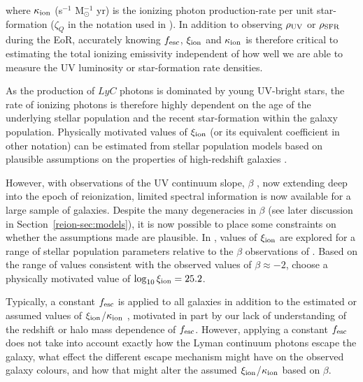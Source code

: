 \noindent where $\kappa_{\rm{ion}}$ (s$^{-1}$ M$_{\odot}^{-1}$ yr) is the ionizing photon production-rate per unit star-formation ($\zeta_{Q}$ in the notation used in \citet{2010Natur.468...49R}). In addition to observing $\rho_{\rm{UV}}$ or $\rho_{\rm{SFR}}$ during the EoR, accurately knowing $f_{\rm{esc}}$, $\xi_{\rm{ion}}$ and $\kappa_{\rm{ion}}$ is therefore critical to estimating the total ionizing emissivity independent of how well we are able to measure the UV luminosity or star-formation rate densities.

As the production of $LyC$ photons is dominated by young UV-bright stars, the rate of ionizing photons is therefore highly dependent on the age of the underlying stellar population and the recent star-formation within the galaxy population. Physically motivated values of $\xi_{\rm{ion}}$ (or its equivalent coefficient in other notation) can be estimated from stellar population models based on plausible assumptions on the properties of high-redshift galaxies \citep{Bolton:2007gc,Ouchi:2009jd,Kuhlen:2012ka}. 

However, with observations of the UV continuum slope, $\beta$ \citep{1994ApJ...429..582C}, now extending deep into the epoch of reionization, limited spectral information is now available for a large sample of galaxies. Despite the many degeneracies in $\beta$ (see later discussion in Section~\ref{reion-sec:models}), it is now possible to place some constraints on whether the assumptions made are plausible. In , values of $\xi_{\rm{ion}}$ are explored for a range of stellar population parameters relative to the $\beta$ observations of \citet{Dunlop:2013kp}. Based on the range of values consistent with the observed values of $\beta \approx -2$, \citeauthor{Robertson:2013ji} choose a physically motivated value of $\log_{10}\xi_{\rm{ion}} = 25.2$. 

Typically, a constant $f_{\rm{esc}}$ is applied to all galaxies in addition to the estimated or assumed values of $\xi_{\rm{ion}}$/$\kappa_{\rm{ion}}$ \citep{Ouchi:2009jd,Finkelstein:2012hr,Robertson:2013ji}, motivated in part by our lack of understanding of the redshift or halo mass dependence of $f_{\rm{esc}}$. However, applying a constant $f_{\rm{esc}}$ does not take into account exactly how the Lyman continuum photons escape the galaxy, what effect the different escape mechanism might have on the observed galaxy colours, and how that might alter the assumed $\xi_{\rm{ion}}$/$\kappa_{\rm{ion}}$ based on $\beta$. 

